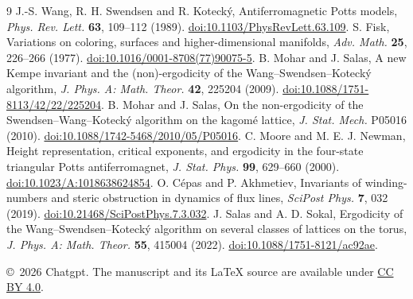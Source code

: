 \documentclass[11pt,a4paper]{article}
\begin{document}
\begin{thebibliography}{9}
 J.-S. Wang, R. H. Swendsen and R. Koteck\'y, Antiferromagnetic Potts models, \emph{Phys. Rev. Lett.} \textbf{63}, 109--112 (1989).
\href{https://doi.org/10.1103/PhysRevLett.63.109}{doi:10.1103/PhysRevLett.63.109}.
 S. Fisk, Variations on coloring, surfaces and higher-dimensional manifolds, \emph{Adv. Math.} \textbf{25}, 226--266 (1977).
\href{https://doi.org/10.1016/0001-8708(77)90075-5}{doi:10.1016/0001-8708(77)90075-5}.
 B. Mohar and J. Salas, A new Kempe invariant and the (non)-ergodicity of the Wang--Swendsen--Koteck\'y algorithm, \emph{J. Phys. A: Math. Theor.} \textbf{42}, 225204 (2009).
\href{https://doi.org/10.1088/1751-8113/42/22/225204}{doi:10.1088/1751-8113/42/22/225204}.
 B. Mohar and J. Salas, On the non-ergodicity of the Swendsen--Wang--Koteck\'y algorithm on the kagom\'e lattice, \emph{J. Stat. Mech.} P05016 (2010).
\href{https://doi.org/10.1088/1742-5468/2010/05/P05016}{doi:10.1088/1742-5468/2010/05/P05016}.
 C. Moore and M. E. J. Newman, Height representation, critical exponents, and ergodicity in the four-state triangular Potts antiferromagnet, \emph{J. Stat. Phys.} \textbf{99}, 629--660 (2000).
\href{https://doi.org/10.1023/A:1018638624854}{doi:10.1023/A:1018638624854}.
 O. C\'epas and P. Akhmetiev, Invariants of winding-numbers and steric obstruction in dynamics of flux lines, \emph{SciPost Phys.} \textbf{7}, 032 (2019).
\href{https://doi.org/10.21468/SciPostPhys.7.3.032}{doi:10.21468/SciPostPhys.7.3.032}.
 J. Salas and A. D. Sokal, Ergodicity of the Wang--Swendsen--Koteck\'y algorithm on several classes of lattices on the torus, \emph{J. Phys. A: Math. Theor.} \textbf{55}, 415004 (2022).
\href{https://doi.org/10.1088/1751-8121/ac92ae}{doi:10.1088/1751-8121/ac92ae}.
\end{thebibliography}
\smallskip\noindent\footnotesize
\copyright\ 2026 Chatgpt. The manuscript and its \LaTeX{} source are available under \href{https://creativecommons.org/licenses/by/4.0/}{CC BY 4.0}.
\end{document}

